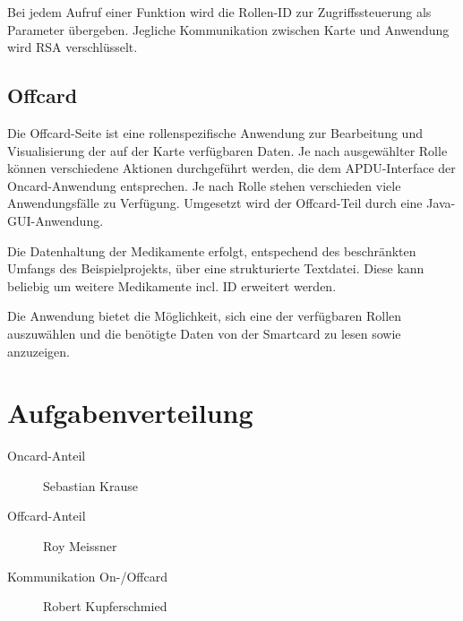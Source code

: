 \documentclass[parskip]{scrartcl}
\begin{document}
			Bei jedem Aufruf einer Funktion wird die Rollen-ID zur Zugriffssteuerung als Parameter übergeben. Jegliche Kommunikation zwischen Karte und Anwendung wird RSA verschlüsselt.
		
		\subsection{Offcard}
			Die Offcard-Seite ist eine rollenspezifische Anwendung zur Bearbeitung und Visualisierung der auf der Karte verfügbaren Daten. Je nach ausgewählter Rolle können verschiedene Aktionen durchgeführt werden, die dem APDU-Interface der Oncard-Anwendung entsprechen. Je nach Rolle stehen verschieden viele Anwendungsfälle zu Verfügung. Umgesetzt wird der Offcard-Teil durch eine Java-GUI-Anwendung. 
			
			Die Datenhaltung der Medikamente erfolgt, entspechend des beschränkten Umfangs des Beispielprojekts, über eine strukturierte Textdatei. Diese kann beliebig um weitere Medikamente incl. ID erweitert werden.
			
			Die Anwendung bietet die Möglichkeit, sich eine der verfügbaren Rollen auszuwählen und die benötigte Daten von der Smartcard zu lesen sowie anzuzeigen.
		
	\section{Aufgabenverteilung}
		\begin{description}
			\item[Oncard-Anteil] Sebastian Krause
			\item[Offcard-Anteil] Roy Meissner
			\item[Kommunikation On-/Offcard] Robert Kupferschmied
		\end{description}
	
\end{document}
